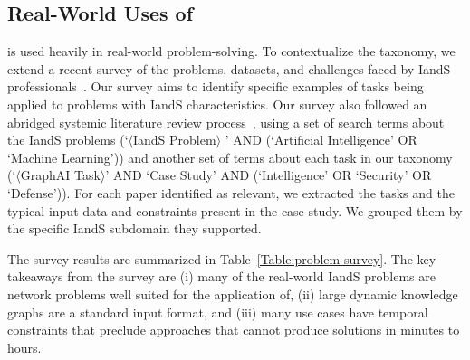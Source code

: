 

\subsection{Real-World Uses of \gai}

\gai is used heavily in real-world problem-solving. 
To contextualize the \gai taxonomy, we extend a recent survey of the problems, datasets, and challenges faced by \ac{IandS} professionals~\cite{Regli2022a}.
Our survey aims to identify specific examples of \gai tasks being applied to problems with \ac{IandS} characteristics.
Our survey also followed an abridged systemic literature review process~\cite{Okoli2015}, using a set of search terms about the \ac{IandS} problems (`$\langle$\ac{IandS} Problem$\rangle$ ' AND (`Artificial Intelligence' OR `Machine Learning')) and another set of terms about each task in our \gai taxonomy (`$\langle$GraphAI Task$\rangle$' AND `Case Study' AND (`Intelligence' OR `Security' OR `Defense')).
\noindent For each paper identified as relevant, we extracted the \gai tasks and the typical input data and constraints present in the case study. 
We grouped them by the specific \ac{IandS} subdomain they supported. 

The survey results are summarized in  Table~\ref{Table:problem-survey}. 
The key takeaways from the survey are 
(i) many of the real-world \ac{IandS} problems are network problems well suited for the application of,
(ii) large dynamic knowledge graphs are a standard input format, and 
(iii) many use cases have temporal constraints that preclude \gai approaches that cannot produce solutions in minutes to hours.



